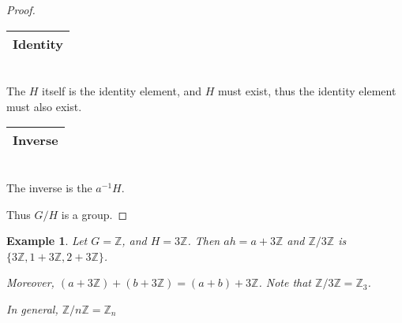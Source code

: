 \documentclass{article}
\theoremstyle{MyNonumberplain}
\theoremstyle{break}
\newtheorem*{proof}{Proof. }
\theoremstyle{break}
\newtheorem{example}{Example}[section]
\theoremstyle{break}
\theoremstyle{definition}
\theoremstyle{break}
\begin{document}
\begin{thmbox}
\begin{prfbox}
\begin{proof}
              \begin{tabular}{|c|}
                \hline
                Identity\\
                \hline
              \end{tabular}\\
              
              The $H$ itself is the identity element, and $H$ must exist, thus the identity
              element must also exist.\bigskip
              
              \begin{tabular}{|c|}
                \hline
                Inverse\\
                \hline
              \end{tabular}\\
              
              The inverse is the $a^{- 1} H$.\bigskip
              
              Thus $G / H$ is a group. 
        \end{proof}
    \end{prfbox}

\end{thmbox}

\begin{expbox}
    \begin{example}
        Let $G =\mathbb{Z}$, and $H = 3\mathbb{Z}$. Then $a h = a + 3\mathbb{Z}$ and
        $\mathbb{Z}/ 3\mathbb{Z}$ is $\{ 3\mathbb{Z}, 1 + 3\mathbb{Z}, 2 + 3\mathbb{Z}
        \}$.\bigskip

        Moreover, $(a + 3\mathbb{Z}) + (b + 3\mathbb{Z}) = (a + b) + 3\mathbb{Z}$.
        Note that $\mathbb{Z}/ 3\mathbb{Z}=\mathbb{Z}_3$.\bigskip

        In general, $\mathbb{Z}/ n\mathbb{Z}=\mathbb{Z}_n$

    \end{example}
\end{expbox}
\end{document}
